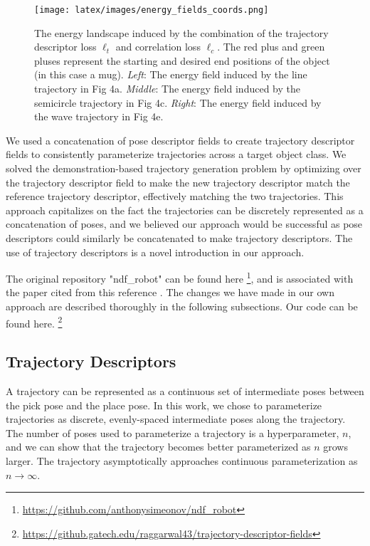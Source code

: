 \documentclass[10pt,twocolumn,letterpaper]{article}
\begin{document}
\begin{figure*}[h]
    \centering
    \texttt{[image: latex/images/energy\_fields\_coords.png]}
    \caption{The energy landscape induced by the combination of the trajectory descriptor loss $\ell_t$ and correlation loss $\ell_c$. The red plus and green pluses represent the starting and desired end positions of the object (in this case a mug). \textit{Left}: The energy field induced by the line trajectory in Fig 4a.  \textit{Middle}: The energy field induced by the semicircle trajectory in Fig 4c. \textit{Right}: The energy field induced by the wave trajectory in Fig 4e.}
    \label{fig:energy-fields}
\end{figure*}

We used a concatenation of pose descriptor fields to create trajectory descriptor fields to consistently parameterize trajectories across a target object class. We solved the demonstration-based trajectory generation problem by optimizing over the trajectory descriptor field to make the new trajectory descriptor match the reference trajectory descriptor, effectively matching the two trajectories. This approach capitalizes on the fact the trajectories can be discretely represented as a concatenation of poses, and we believed our approach would be successful as pose descriptors could similarly be concatenated to make trajectory descriptors. The use of trajectory descriptors is a novel introduction in our approach.

The original repository "ndf\_robot" can be found here \footnote{\href{https://github.com/anthonysimeonov/ndf\_robot}{https://github.com/anthonysimeonov/ndf\_robot}}, and is associated with the paper cited from this reference \cite{simeonovdu2021ndf}. The changes we have made in our own approach are described thoroughly in the following subsections. Our code can be found here. \footnote{\href{https://github.gatech.edu/raggarwal43/trajectory-descriptor-fields}{https://github.gatech.edu/raggarwal43/trajectory-descriptor-fields}}

\subsection{Trajectory Descriptors}
A trajectory can be represented as a continuous set of intermediate poses between the pick pose and the place pose. In this work, we chose to parameterize trajectories as discrete, evenly-spaced intermediate poses along the trajectory. The number of poses used to parameterize a trajectory is a hyperparameter, $n$, and we can show that the trajectory becomes better parameterized as $n$ grows larger. The trajectory asymptotically approaches continuous parameterization as $n \rightarrow \infty$. 
\end{document}
